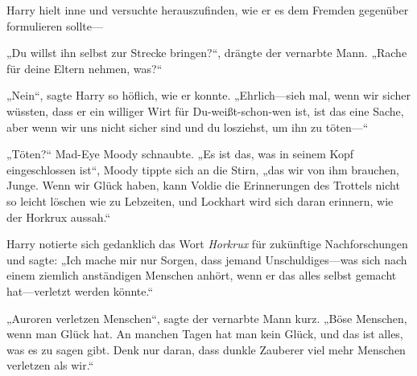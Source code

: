 Harry hielt inne und versuchte herauszufinden, wie er es dem Fremden gegenüber formulieren sollte—

„Du willst ihn selbst zur Strecke bringen?“, drängte der vernarbte Mann. „Rache für deine Eltern nehmen, was?“

„Nein“, sagte Harry so höflich, wie er konnte. „Ehrlich—sieh mal, wenn wir sicher wüssten, dass er ein williger Wirt für Du-weißt-schon-wen ist, ist das eine Sache, aber wenn wir uns nicht sicher sind und du losziehst, um ihn zu töten—“

„Töten?“ Mad-Eye Moody schnaubte. „Es ist das, was in seinem Kopf eingeschlossen ist“, Moody tippte sich an die Stirn, „das wir von ihm brauchen, Junge. Wenn wir Glück haben, kann Voldie die Erinnerungen des Trottels nicht so leicht löschen wie zu Lebzeiten, und Lockhart wird sich daran erinnern, wie der Horkrux aussah.“

Harry notierte sich gedanklich das Wort \emph{Horkrux} für zukünftige Nachforschungen und sagte: „Ich mache mir nur Sorgen, dass jemand Unschuldiges—was sich nach einem ziemlich anständigen Menschen anhört, wenn er das alles selbst gemacht hat—verletzt werden könnte.“

„Auroren verletzen Menschen“, sagte der vernarbte Mann kurz. „Böse Menschen, wenn man Glück hat. An manchen Tagen hat man kein Glück, und das ist alles, was es zu sagen gibt. Denk nur daran, dass dunkle Zauberer viel mehr Menschen verletzen als wir.“

